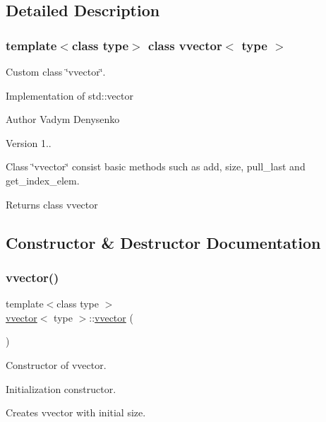 \subsection{Detailed Description}
\subsubsection*{template$<$class type$>$\newline
class vvector$<$ type $>$}

Custom class \char`\"{}vvector\char`\"{}. 

Implementation of std\+::vector \begin{DoxyAuthor}{Author}
Vadym Denysenko 
\end{DoxyAuthor}
\begin{DoxyVersion}{Version}
1..
\end{DoxyVersion}
Class \char`\"{}vvector\char`\"{} consist basic methods such as add, size, pull\+\_\+last and get\+\_\+index\+\_\+elem.

\begin{DoxyReturn}{Returns}
class vvector 
\end{DoxyReturn}


\subsection{Constructor \& Destructor Documentation}
\mbox{\label{classvvector_ab4b7e31d3baef30147eec4b80a13b26a}} 
\subsubsection{\texorpdfstring{vvector()}{vvector()}}
{\footnotesize\ttfamily template$<$class type $>$ \\
\hyperlink{classvvector}{vvector}$<$ type $>$\+::\hyperlink{classvvector}{vvector} (\begin{DoxyParamCaption}{ }\end{DoxyParamCaption})}



Constructor of vvector. 

Initialization constructor.

Creates vvector with initial size. \mbox{\label{classvvector_a01d5bcd372c6823a67add01d359dc8b3}} 
